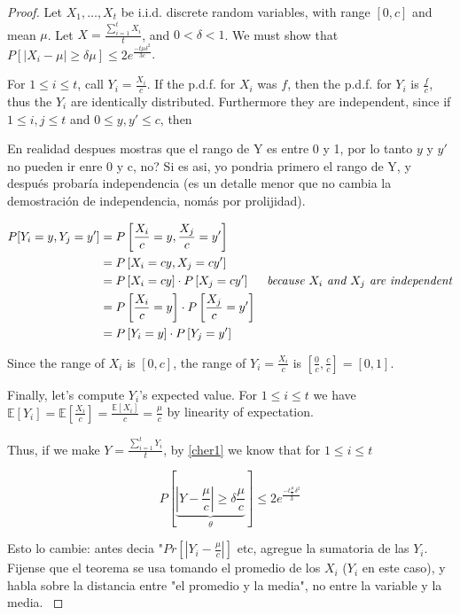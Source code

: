 \documentclass[11pt]{amsart}
\begin{document}
\begin{proof}
Let $X_1, \dots, X_t$ be i.i.d. discrete random variables, with range $[0, c]$ and mean $\mu$. Let $X = \frac{\sum_{i=1}^t X_i}{t}$, and $0 < \delta < 1$. We must show that $P\left[\left|X_i - \mu\right| \ge \delta \mu\right] \le 2 e^{\frac{-t \mu \delta^2}{3c}}$.

For $1 \le i \le t$, call $Y_i = \frac{X_i}{c}$. If the p.d.f. for $X_i$ was $f$, then the p.d.f. for $Y_i$ is $\frac{f}{c}$, thus the $Y_i$ are identically distributed. Furthermore they are independent, since if $1 \le i, j \le t$ and $0 \le y, y' \le c$, then

{\color{red}
En realidad despues mostras que el rango de Y es entre 0 y 1, por lo tanto $y$ y $y'$ no pueden ir enre 0 y c, no? Si es asi, yo pondria primero el rango de Y, y después probaría independencia (es un detalle menor que no cambia la demostración de independencia, nomás por prolijidad).
}

\begin{align*}
P[Y_i = y, Y_j = y'] &= P\left[\frac{X_i}{c} = y,  \frac{X_j}{c} = y'\right]&\\
                     &= P\left[X_i = cy, X_j = cy'\right]&\\
                     &= P\left[X_i = cy \right] \cdot P\left[X_j = cy' \right] &\text{\emph{because $X_i$ and $X_j$ are independent}}\\
                     &= P\left[\frac{X_i}{c} = y\right] \cdot P\left[\frac{X_j}{c} = y'\right]&\\
                     &= P\left[Y_i = y\right] \cdot P\left[Y_j = y' \right]&
\end{align*}

Since the range of $X_i$ is $[0, c]$, the range of $Y_i = \frac{X_i}{c}$ is $\left[\frac{0}{c}, \frac{c}{c}\right] = [0, 1]$.

Finally, let's compute $Y_i$'s expected value. For $1 \le i \le t$ we have $\mathbb{E}[Y_i] = \mathbb{E}\left[\frac{X_i}{c}\right] = \frac{\mathbb{E}\left[X_i\right]}{c} = \frac{\mu}{c}$ by linearity of expectation. 

Thus, if we make $Y = \frac{\sum_{i=1}^t Y_i}{t}$, by \ref{cher1} we know that for $1 \le i \le t$

$$
P\left[\underbrace{\left|Y - \frac{\mu}{c}\right| \ge \delta \frac{\mu}{c}}_{\theta}\right] \le 2 e^{\frac{-t \frac{\mu}{c} \delta^2}{3}}
$$

{\color{red}
Esto lo cambie: antes decia "$Pr [|Y_i - \frac{\mu}{c}|]$ etc, agregue la sumatoria de las $Y_i$. Fijense que el teorema se usa tomando el promedio de los $X_i$ ($Y_i$ en este caso), y habla sobre la distancia entre "el promedio y la media", no entre la variable y la media.
}


\end{proof}
\end{document}
